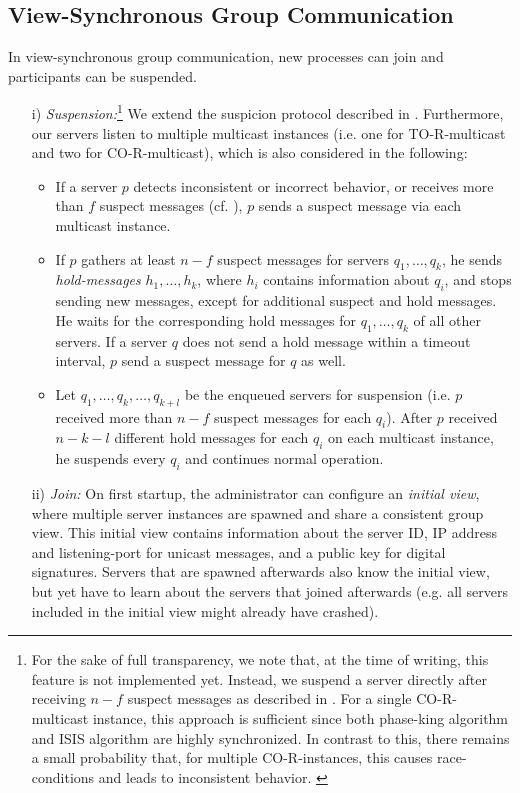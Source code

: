 \documentclass[runningheads]{llncs}
\begin{document}
\subsection{View-Synchronous Group Communication} \label{sec:view_sync_comm}
In view-synchronous group communication, new processes can join and participants can be suspended. 
\begin{enumerate}
    \item[i)] \textit{Suspension:}\footnote{For the sake of full transparency, we note that, at the time of writing, this feature is not implemented yet. Instead, we suspend a server directly after receiving $n-f$ suspect messages as described in . For a single CO-R-multicast instance, this approach is sufficient since both phase-king algorithm and ISIS algorithm are highly synchronized. In contrast to this, there remains a small probability that, for multiple CO-R-instances, this causes race-conditions and leads to inconsistent behavior. \label{footnote:suspension}} We extend the suspicion protocol described in . Furthermore, our servers listen to multiple multicast instances (i.e. one for TO-R-multicast and two for CO-R-multicast), which is also considered in the following: 
    \begin{itemize}
        \item If a server $p$ detects inconsistent or incorrect behavior, or receives more than $f$ suspect messages (cf. ), $p$ sends a suspect message via each multicast instance.
        \item If $p$ gathers at least $n-f$ suspect messages for servers $q_1, \ldots, q_k$, he sends \textit{hold-messages} $h_1, \ldots, h_k$, where $h_i$ contains information about $q_i$, and stops sending new messages, except for additional suspect and hold messages. He waits for the corresponding hold messages for $q_1, \ldots, q_k$ of all other servers. If a server $q$ does not send a hold message within a timeout interval, $p$ send a suspect message for $q$ as well. 
        \item Let $q_1, \ldots, q_k, \ldots, q_{k+l}$ be the enqueued servers for suspension (i.e. $p$ received more than $n-f$ suspect messages for each $q_i$). After $p$ received $n-k-l$ different hold messages for each $q_i$ on each multicast instance, he suspends every $q_i$ and continues normal operation.
    \end{itemize} 
    \item[ii)] \textit{Join:} On first startup, the administrator can configure an \textit{initial view}, where multiple server instances are spawned and share a consistent group view. This initial view contains information about the server ID, IP address and listening-port for unicast messages, and a public key for digital signatures. Servers that are spawned afterwards also know the initial view, but yet have to learn about the servers that joined afterwards (e.g. all servers included in the initial view might already have crashed). 

\end{enumerate}
\end{document}

